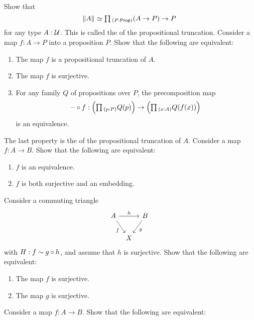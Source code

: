 \begin{exercises}
\begin{subexenum}
  \end{subexenum}
  \exercise Show that
  \begin{equation*}
    \eqv{\brck{A}}{\prd{P:\prop}(A\to P)\to P}
  \end{equation*}
  for any type $A:\mathcal{U}$. This is called the  of the propositional truncation.
  \exercise Consider a map $f:A\to P$ into a proposition $P$. Show that the following are equivalent:
  \begin{enumerate}
  \item The map $f$ is a propositional truncation of $A$.
  \item The map $f$ is surjective.
  \item For any family $Q$ of propositions over $P$, the precomposition map
    \begin{equation*}
      \blank\circ f : \Big(\prd{p:P}Q(p)\Big)\to \Big(\prd{x:A}Q(f(x))\Big)
    \end{equation*}
    is an equivalence.
  \end{enumerate}
  The last property is the  of the propositional truncation of $A$.
  \exercise Consider a map $f:A\to B$. Show that the following are equivalent:
  \begin{enumerate}
  \item $f$ is an equivalence.
  \item $f$ is both surjective and an embedding.
  \end{enumerate}
  \exercise Consider a commuting triangle
  \begin{equation*}
    \begin{tikzcd}[column sep=tiny]
      A \arrow[rr,"h"] \arrow[dr,swap,"f"] & & B \arrow[dl,"g"] \\
      & X
    \end{tikzcd}
  \end{equation*}
  with $H:f\sim g\circ h$, and assume that $h$ is surjective. Show that the following are equivalent:
  \begin{enumerate}
  \item The map $f$ is surjective.
  \item The map $g$ is surjective.
  \end{enumerate}
  \exercise \label{ex:surjective-precomp}Consider a map $f:A\to B$. Show that the following are equivalent:

\end{exercises}
